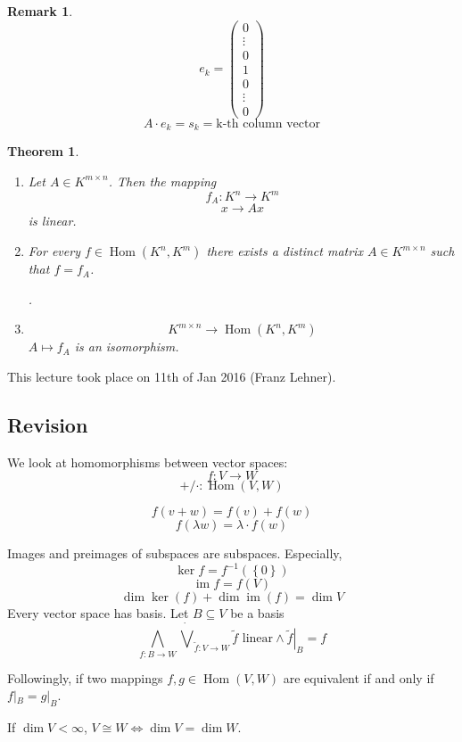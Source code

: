 \documentclass[a4paper,landscape,twocolumn]{article}
\newcommand\meta[3]{This #1 took place on #2 (#3).\par}
\newcommand\set[1]{\left\{#1\right\}}
\newtheorem{theorem}{Theorem}
\newtheorem{rem}{Remark}
\DeclareMathOperator\Hom{Hom} %
\DeclareMathOperator\image{im} %
\DeclareMathOperator\kernel{ker} %
\begin{document}
%
\begin{rem}
  \[ e_k = \begin{pmatrix} 0 \\ \vdots \\ 0 \\ 1 \\ 0 \\ \vdots \\ 0 \end{pmatrix} \]
  \[ A \cdot e_{k} = s_k = \text{k-th column vector} \]
\end{rem}
%
\begin{theorem}
  \label{satz-6-5}
  \begin{enumerate}
    \item
      Let $A \in K^{m\times n}$.
      Then the mapping
      \[ f_A: K^n \rightarrow K^m \]
      \[ x \rightarrow Ax \]
      is linear.
    \item
      For every $f \in \Hom(K^n, K^m)$ there exists a distinct matrix
      $A \in K^{m\times n}$ such that $f = f_A$.

      .
    \item
      \[ K^{m\times n} \rightarrow \Hom(K^n, K^m) \]
      $A \mapsto f_A$ is an isomorphism.
  \end{enumerate}
\end{theorem}

\meta{lecture}{11th of Jan 2016}{Franz Lehner}

\subsection{Revision}

We look at homomorphisms between vector spaces:
\[ f: V \rightarrow W \]
\[ +/\cdot: \Hom(V, W) \]

\[ f(v + w) = f(v) + f(w) \]
\[ f(\lambda w) = \lambda \cdot f(w) \]

Images and preimages of subspaces are subspaces. Especially,
\[ \kernel{f} = f^{-1}(\set{0}) \]
\[ \image{f} = f(V) \]
\[ \dim{\kernel(f)} + \dim{\image(f)} = \dim{V} \]
Every vector space has basis. Let $B \subseteq V$ be a basis
\[
  \bigwedge_{f: B \rightarrow W} \dot\bigvee_{\tilde f: V \rightarrow W}
  \tilde{f} \text{ linear} \land \left.\tilde{f}\right|_{B} = f
\]

Followingly, if two mappings $f, g \in \Hom(V, W)$ are equivalent
if and only if $f|_B = g|_B$.

If $\dim{V} < \infty$, $V \cong W \Leftrightarrow \dim{V} = \dim{W}$.
\end{document}
